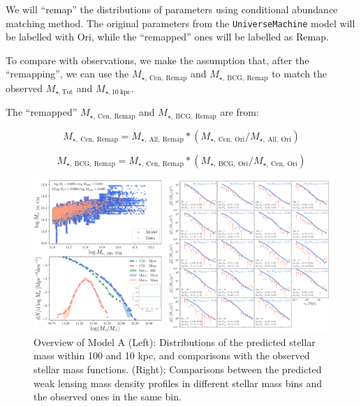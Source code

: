 \documentclass[a4paper,fleqn,usenatbib]{mnras}
\def\mtot{{$M_{\star,\mathrm{Tot}}$}}
\def\minn{{$M_{\star,10\ \mathrm{kpc}}$}}
\def\um{\texttt{UniverseMachine}}
\begin{document}
    We will ``remap'' the distributions of parameters 
    using conditional abundance matching method.  
    The original parameters from the \um{} model will be labelled with $\mathrm{Ori}$, 
    while the ``remapped'' ones will be labelled as $\mathrm{Remap}$.  

    To compare with observations, we make the assumption that, after the ``remapping'', 
    we can use the $M_{\star,\ \mathrm{Cen,\ Remap}}$ and 
    $M_{\star,\ \mathrm{BCG,\ Remap}}$ to match the observed \mtot{} and \minn{}.

    The ``remapped'' $M_{\star,\ \mathrm{Cen,\ Remap}}$ and 
    $M_{\star,\ \mathrm{BCG,\ Remap}}$ are from: 

    \begin{equation}
        M_{\star,\ \mathrm{Cen,\ Remap}} = M_{\star,\ \mathrm{All,\ Remap}} * 
            (M_{\star,\ \mathrm{Cen,\ Ori}} / M_{\star,\ \mathrm{All,\ Ori}})
    \end{equation}

    \begin{equation}
        M_{\star,\ \mathrm{BCG,\ Remap}} = M_{\star,\ \mathrm{Cen,\ Remap}} * 
            (M_{\star,\ \mathrm{BCG,\ Ori}} / M_{\star,\     \mathrm{Cen,\ Ori}})
    \end{equation}

     

    \begin{figure}
        \centering 
        \includegraphics[width=\textwidth]{fig/um2_model_A}
            \caption{
                Overview of Model A 
                (Left): Distributions of the predicted stellar mass within 100 and 
                10 kpc, and comparisons with the observed stellar mass functions.  
                (Right): Comparisons between the predicted weak lensing mass density 
                profiles in different stellar mass bins and the observed ones in the 
                same bin.
                }
        \label{fig:um2_m100_m10_1}
    \end{figure}
\end{document}
